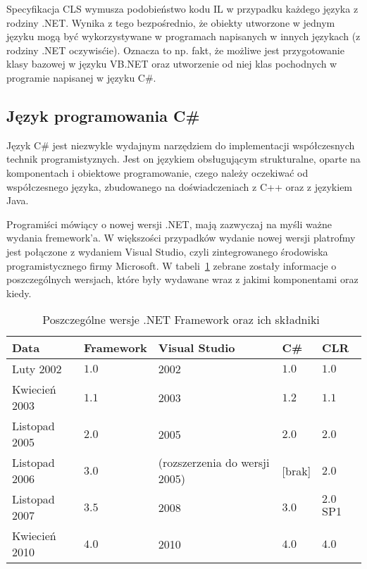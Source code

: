 Specyfikacja CLS wymusza podobieństwo kodu IL w przypadku każdego języka z rodziny .NET. Wynika z tego bezpośrednio, że obiekty utworzone w jednym języku mogą być wykorzystywane w programach napisanych w innych językach (z rodziny .NET oczywisćie). Oznacza to np. fakt, że możliwe jest przygotowanie klasy bazowej w języku VB.NET oraz utworzenie od niej klas pochodnych w programie napisanej w języku C\#.

\subsection{Język programowania C\#}
Język C\# jest niezwykle wydajnym narzędziem do implementacji współczesnych technik programistyznych. Jest on językiem obsługującym strukturalne, oparte na komponentach i obiektowe programowanie, czego należy oczekiwać od współczesnego języka, zbudowanego na doświadczeniach z C++ oraz z językiem Java. 

Programiści mówiący o nowej wersji .NET, mają zazwyczaj na myśli ważne wydania fremework'a. W większości przypadków wydanie nowej wersji platrofmy jest połączone z wydaniem Visual Studio, czyli zintegrowanego środowiska programistycznego firmy Microsoft. W tabeli~\ref{dotNet:dates} zebrane zostały informacje o poszczególnych wersjach, które były wydawane wraz z jakimi komponentami oraz kiedy.

\begin{table}
	\centering
	\begin{tabular}{|l|l|l|l|l|} \hline
	\textbf{Data} & \textbf{Framework} & \textbf{Visual Studio} & \textbf{C\#} & \textbf{CLR} \\ \hline
	Luty 2002 & $1.0$ & 2002 & $1.0$ & $1.0$ \\ 
	Kwiecień 2003 & $1.1$ & 2003 & $1.2$ & $1.1$ \\ 
	Listopad 2005 & $2.0$ & 2005 & $2.0$ & $2.0$ \\ 
	Listopad 2006 & $3.0$ & (rozszerzenia do wersji 2005) & [brak] & $2.0$ \\ 
	Listopad 2007 & $3.5$ & 2008 & $3.0$ & $2.0$ SP1 \\ 
	Kwiecień 2010 & $4.0$ & 2010 & $4.0$ & $4.0$ \\ \hline
	\end{tabular}
	\caption{Poszczególne wersje .NET Framework oraz ich składniki~\cite{cSharp:inDepthS}\label{dotNet:dates}}
\end{table}

